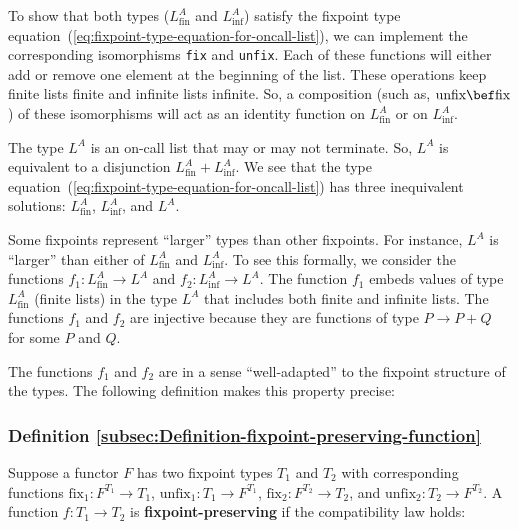 To show that both types ($L_{\text{fin}}^{A}$ and $L_{\text{inf}}^{A}$)
satisfy the fixpoint type equation~(\ref{eq:fixpoint-type-equation-for-oncall-list}),
we can implement the corresponding isomorphisms \lstinline!fix!
and \lstinline!unfix!.
Each of these functions will either add or remove one element at the
beginning of the list. These operations keep finite lists finite and
infinite lists infinite. So, a composition (such as, $\text{unfix}\bef\text{fix}$)
of these isomorphisms will act as an identity function on $L_{\text{fin}}^{A}$
or on $L_{\text{inf}}^{A}$.

The type $L^{A}$ is an on-call list that may or may not terminate.
So, $L^{A}$ is equivalent to a disjunction $L_{\text{fin}}^{A}+L_{\text{inf}}^{A}$.
We see that the type equation~(\ref{eq:fixpoint-type-equation-for-oncall-list})
has three inequivalent solutions: $L_{\text{fin}}^{A}$, $L_{\text{inf}}^{A}$,
and $L^{A}$.

Some fixpoints represent \textsf{``}larger\textsf{''} types than other fixpoints.
For instance, $L^{A}$ is \textsf{``}larger\textsf{''} than either of $L_{\text{fin}}^{A}$
and $L_{\text{inf}}^{A}$. To see this formally, we consider the functions
$f_{1}:L_{\text{fin}}^{A}\rightarrow L^{A}$ and $f_{2}:L_{\text{inf}}^{A}\rightarrow L^{A}$.
The function $f_{1}$ embeds values of type $L_{\text{fin}}^{A}$
(finite lists) in the type $L^{A}$ that includes both finite and
infinite lists. The functions $f_{1}$ and $f_{2}$ are injective
because they are functions of type $P\rightarrow P+Q$ for some $P$
and $Q$.

The functions $f_{1}$ and $f_{2}$ are in a sense \textsf{``}well-adapted\textsf{''}
to the fixpoint structure of the types. The following definition makes
this property precise:

\subsubsection{Definition \label{subsec:Definition-fixpoint-preserving-function}\ref{subsec:Definition-fixpoint-preserving-function}}

Suppose a functor $F$ has two fixpoint types $T_{1}$ and $T_{2}$
with corresponding functions $\text{fix}_{1}:F^{T_{1}}\rightarrow T_{1}$,
$\text{unfix}_{1}:T_{1}\rightarrow F^{T_{1}}$, $\text{fix}_{2}:F^{T_{2}}\rightarrow T_{2}$,
and $\text{unfix}_{2}:T_{2}\rightarrow F^{T_{2}}$. A function $f:T_{1}\rightarrow T_{2}$
is \textbf{fixpoint-preserving}
if the compatibility law holds:

